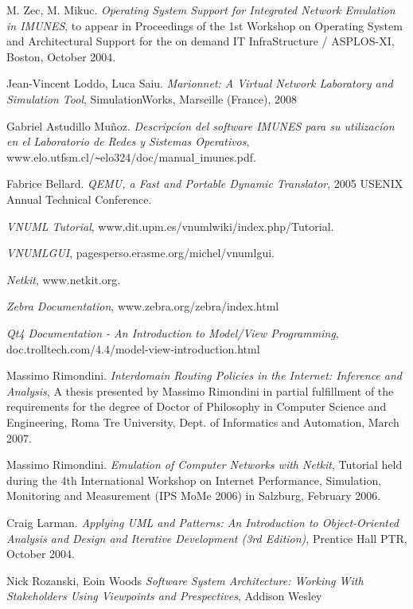 \clearpage
\begin{thebibliography}{9}
	M. Zec, M. Mikuc.
	\emph{Operating System Support for Integrated Network Emulation in IMUNES}, to appear in Proceedings of the 1st Workshop on Operating System and Architectural Support for the on demand IT InfraStructure / ASPLOS-XI, Boston, October 2004.

	Jean-Vincent Loddo, Luca Saiu.
	\emph{Marionnet: A Virtual Network Laboratory and Simulation Tool}, SimulationWorks, Marseille (France), 2008

	Gabriel Astudillo Mu\~{n}oz.
	\emph{Descripcíon del software IMUNES para su utilizacíon en el Laboratorio de Redes y Sistemas Operativos}, www.elo.utfsm.cl/\verb+~+elo324/doc/manual\verb+_+imunes.pdf.

	Fabrice Bellard.
	\emph{QEMU, a Fast and Portable Dynamic Translator}, 2005 USENIX Annual Technical Conference.

	\emph{VNUML Tutorial}, www.dit.upm.es/vnumlwiki/index.php/Tutorial.

	\emph{VNUMLGUI}, pagesperso.erasme.org/michel/vnumlgui.

	\emph{Netkit}, www.netkit.org.

	\emph{Zebra Documentation}, www.zebra.org/zebra/index.html

	\emph{Qt4 Documentation - An Introduction to Model/View Programming}, doc.trolltech.com/4.4/model-view-introduction.html

	Massimo Rimondini.
	\emph{Interdomain Routing Policies in the Internet: Inference and Analysis}, A thesis presented by Massimo Rimondini in partial fulfillment of the requirements for the degree of Doctor of Philosophy in Computer Science and Engineering, Roma Tre University, Dept. of Informatics and Automation, March 2007.

	Massimo Rimondini.
	\emph{Emulation of Computer Networks with Netkit}, Tutorial held during the 4th International Workshop on Internet Performance, Simulation, Monitoring and Measurement (IPS MoMe 2006) in Salzburg, February 2006.

	Craig Larman.
	\emph{Applying UML and Patterns: An Introduction to Object-Oriented Analysis and Design and Iterative Development (3rd Edition)}, Prentice Hall PTR, October 2004.

	Nick Rozanski, Eoin Woods
	\emph{Software System Architecture: Working With Stakeholders Using Viewpoints and Prespectives}, Addison Wesley

\end{thebibliography}
